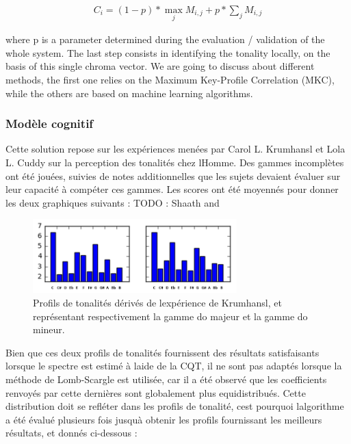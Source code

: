 \documentclass[letterpaper]{article}
\begin{document}
\begin{align}
C_{i} = (1 - p) * \max_{j} M_{i, j} + p * \sum_{j} M_{i, j}
\end{align}

where p is a parameter determined during the evaluation / validation of the whole system. The last step consists in identifying the tonality locally,
on the basis of this single chroma vector. We are going to discuss about different methods, the first one relies on the Maximum Key-Profile Correlation (MKC),
while the others are based on machine learning algorithms.

\subsubsection{Modèle cognitif}

Cette solution repose sur les expériences menées par Carol L. Krumhansl et Lola L. Cuddy sur la perception des tonalités chez l\textquotesingle Homme.
Des gammes incomplètes ont été jouées, suivies de notes additionnelles que les sujets devaient évaluer sur leur capacité à compéter ces gammes. 
Les scores ont été moyennés pour donner les deux graphiques suivants :  TODO : Sha\textquotesingle ath \citep{IS} and \citep{SP} \citep{AT}

\begin{figure}
\begin{center}
\includegraphics[width=3.1in,angle=0]{imgs/Krumhansl.png}
\caption{Profils de tonalités dérivés de l\textquotesingle expérience de Krumhansl, et représentant respectivement la gamme do majeur
et la gamme do mineur.}
\label{fig1}
\end{center}
\end{figure}

Bien que ces deux profils de tonalités fournissent des résultats satisfaisants lorsque le spectre est estimé à l\textquotesingle aide de la CQT, il ne sont pas adaptés lorsque la méthode de Lomb-Scargle est utilisée, car il a été observé que les coefficients renvoyés par cette dernières sont globalement plus equidistribués. Cette distribution doit se refléter dans les profils de tonalité, c\textquotesingle est pourquoi l\textquotesingle algorithme a été évalué plusieurs fois jusqu\textquotesingle à obtenir les profils fournissant les meilleurs résultats, et donnés ci-dessous :
\end{document}
